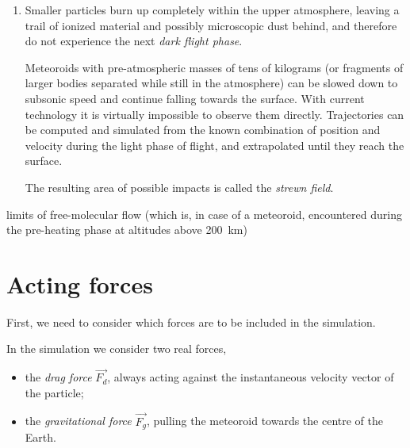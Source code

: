 \begin{enumerate}
                dynamical pressure may exceed the limit of toughness (???) of the particle,
                so fragmentation is also possible. Peak brightness

                For more massive meteoroids (on the order of kilograms to tons) the light phase often continues
                to below \SI{50}{\kilo\metre} or even lower. For dense and solid meteoroids or small asteroids
                it is possible not to be slowed down and impact the surface at hypersonic speeds,
                emitting light until the last moment.

            \item Smaller particles burn up completely within the upper atmosphere,
                leaving a trail of ionized material and possibly microscopic dust behind,
                and therefore do not experience the next \emph{dark flight phase}.

                Meteoroids with pre-atmospheric masses of tens of kilograms (or fragments
                of larger bodies separated while still in the atmosphere) can be slowed down
                to subsonic speed and continue falling towards the surface.
                With current technology it is virtually impossible to observe them directly.
                Trajectories can be computed and simulated from the known combination
                of position and velocity during the light phase of flight, and extrapolated
                until they reach the surface.

                The resulting area of possible impacts is called the \emph{strewn field}.

        \end{enumerate}

        limits of free-molecular flow (which is, in case of a meteoroid,
        encountered during the pre-heating phase at altitudes above \SI{200}{\kilo\metre})


\section{Acting forces} \label{df}
    First, we need to consider which forces are to be included in the simulation.

    In the simulation we consider two real forces,
    \begin{itemize}
        \item the \emph{drag force} $\vec{F_d}$, always acting against the instantaneous velocity vector of the particle;
        \item the \emph{gravitational force} $\vec{F_g}$, pulling the meteoroid towards the centre of the Earth.
    \end{itemize}

